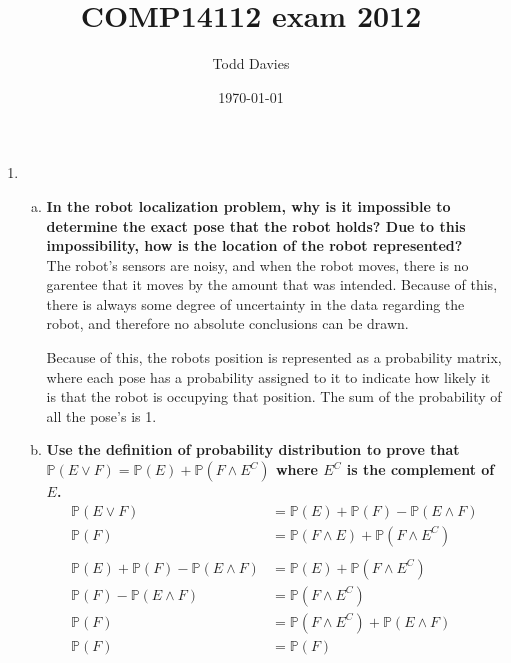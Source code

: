 \documentclass{article}
\author{Todd Davies}
\title{COMP14112 exam 2012}
\date{\today}
\begin{document}
\lhead{\today}

\maketitle

\begin{enumerate}
  
  \item

  \begin{enumerate}[(a)]
    \item {\bf In the robot localization problem, why is it impossible to
           determine the exact pose that the robot holds? Due to this
           impossibility, how is the location of the robot
           represented?}\\
      
      The robot's sensors are noisy, and when the robot moves, there is no
      garentee that it moves by the amount that was intended. Because of
      this, there is always some degree of uncertainty in the data
      regarding the robot, and therefore no absolute conclusions can be
      drawn.

      Because of this, the robots position is represented as a probability
      matrix, where each pose has a probability assigned to it to indicate
      how likely it is that the robot is occupying that position. The sum
      of the probability of all the pose's is 1.

    \item {\bf Use the definition of probability distribution to prove that
           $\mathbb{P}(E \vee F) = \mathbb{P}(E) +
           \mathbb{P}(F \wedge E^C)$ where $E^C$ is the complement of
           $E$.}\\

      \[
        \begin{split}
         \mathbb{P}(E \vee F) &= \mathbb{P}(E) + \mathbb{P}(F) - \mathbb{P}(E \wedge F)\\
         \mathbb{P}(F) &= \mathbb{P}(F \wedge E) + \mathbb{P}(F \wedge E^C)\\\\
         \mathbb{P}(E) + \mathbb{P}(F) - \mathbb{P}(E \wedge F) &= \mathbb{P}(E) + \mathbb{P}(F \wedge E^C)\\
         \mathbb{P}(F) - \mathbb{P}(E \wedge F) &=\mathbb{P}(F \wedge E^C)\\
         \mathbb{P}(F) &=\mathbb{P}(F \wedge E^C) + \mathbb{P}(E \wedge F)\\
         \mathbb{P}(F) &=\mathbb{P}(F)\\
        \end{split}
      \]


\end{enumerate}
\end{enumerate}
\end{document}
